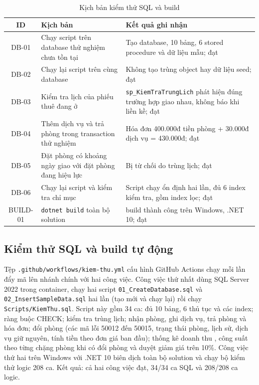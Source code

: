\documentclass[14pt]{report}
\begin{document}
\begin{table}[H]
\centering
\caption{Kịch bản kiểm thử SQL và build}
\label{tab:db-test}
\begin{tabularx}{\textwidth}{|c|X|X|}
\hline
\textbf{ID} & \textbf{Kịch bản} & \textbf{Kết quả ghi nhận} \\\hline
DB-01 & Chạy script trên database thử nghiệm chưa tồn tại & Tạo database, 10 bảng, 6 stored procedure và dữ liệu mẫu; đạt \\\hline
DB-02 & Chạy lại script trên cùng database & Không tạo trùng object hay dữ liệu seed; đạt \\\hline
DB-03 & Kiểm tra lịch của phiếu thuê đang ở & \texttt{sp\_KiemTraTrungLich} phát hiện đúng trường hợp giao nhau, không báo khi liền kề; đạt \\\hline
DB-04 & Thêm dịch vụ và trả phòng trong transaction thử nghiệm & Hóa đơn 400.000đ tiền phòng + 30.000đ dịch vụ = 430.000đ; đạt \\\hline
DB-05 & Đặt phòng có khoảng ngày giao với đặt phòng đang hiệu lực & Bị từ chối do trùng lịch; đạt \\\hline
DB-06 & Chạy lại script và kiểm tra chỉ mục & Script chạy ổn định hai lần, đủ 6 index kiểm tra, gồm index lọc; đạt \\\hline
BUILD-01 & \texttt{dotnet build} toàn bộ solution & build thành công trên Windows, .NET 10; đạt \\\hline
\end{tabularx}
\end{table}

\subsection{Kiểm thử SQL và build tự động}

Tệp \texttt{.github/workflows/kiem-thu.yml} cấu hình GitHub Actions chạy mỗi lần đẩy mã lên nhánh chính với hai công việc. Công việc thứ nhất dùng SQL Server 2022 trong container, chạy hai script \texttt{01\_CreateDatabase.sql} và \texttt{02\_InsertSampleData.sql} hai lần (tạo mới và chạy lại) rồi chạy \texttt{Scripts/KiemThu.sql}. Script này gồm 34 ca: đủ 10 bảng, 6 thủ tục và các index; ràng buộc CHECK; kiểm tra trùng lịch; nhận phòng, ghi dịch vụ, trả phòng và hóa đơn; đổi phòng (các mã lỗi 50012 đến 50015, trạng thái phòng, lịch sử, dịch vụ giữ nguyên, tính tiền theo đơn giá ban đầu); thống kê doanh thu , công suất theo từng chặng phòng khi có đổi phòng và duyệt giảm giá trên 10\%. Công việc thứ hai trên Windows với .NET 10 biên dịch toàn bộ solution và chạy bộ kiểm thử logic 208 ca. Kết quả: cả hai công việc đạt, 34/34 ca SQL và 208/208 ca logic.
\end{document}
